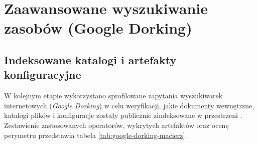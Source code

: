 {{\section{Zaawansowane wyszukiwanie zasobów (Google Dorking)}\label{sec:google-dorking}

\subsection{Indeksowane katalogi i artefakty konfiguracyjne}\label{subsec:dorking-katalogi}

W kolejnym etapie wykorzystano sprofilowane zapytania wyszukiwarek internetowych (\textit{Google Dorking}) w celu weryfikacji, jakie dokumenty wewnętrzne, katalogi plików i konfiguracje zostały publicznie zindeksowane w przestrzeni . Zestawienie zastosowanych operatorów, wykrytych artefaktów oraz ocenę perymetru przedstawia tabela \ref{tab:google-dorking-macierz}.

}}
